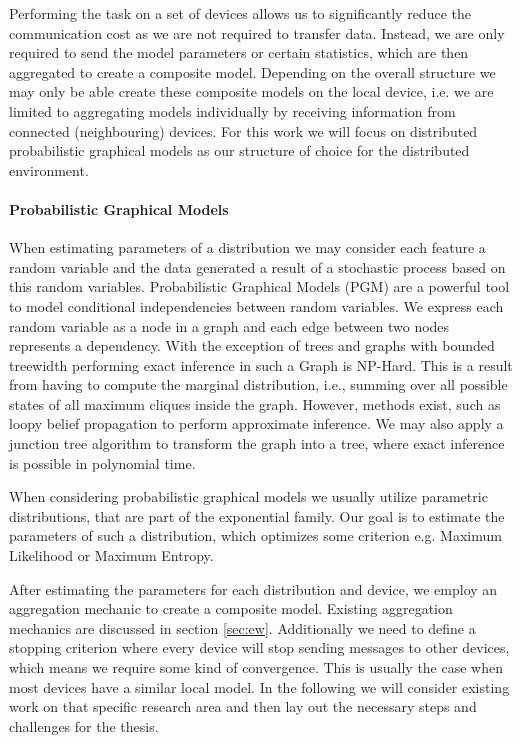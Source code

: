   Performing the task on a set of devices allows us to significantly reduce the communication cost as we are not required to transfer data.
  Instead, we are only required to send the model parameters or certain statistics, which are then aggregated to create a composite model.
  Depending on the overall structure we may only be able create these composite models on the local device, i.e. we are limited to aggregating models individually by receiving information from connected (neighbouring) devices.
  For this work we will focus on distributed probabilistic graphical models as our structure of choice for the distributed environment.
  \paragraph{Probabilistic Graphical Models}  


  When estimating parameters of a distribution we may consider each feature a random variable and the data generated a result of a stochastic process based on this random variables.
  Probabilistic Graphical Models (PGM) are a powerful tool to model conditional independencies between random variables. 
  We express each random variable as a node in a graph and each edge between two nodes represents a dependency. 
  With the exception of trees and graphs with bounded treewidth performing exact inference in such a Graph is NP-Hard.
  This is a result from having to compute the marginal distribution, i.e., summing over all possible states of all maximum cliques inside the graph.
  However, methods exist, such as loopy belief propagation to perform approximate inference.
  We may also apply a junction tree algorithm to transform the graph into a tree, where exact inference is possible in polynomial time.
    
  When considering probabilistic graphical models we usually utilize parametric distributions, that are part of the exponential family. 
  Our goal is to estimate the parameters of such a distribution, which optimizes some criterion e.g. Maximum Likelihood or Maximum Entropy.
  

  After estimating the parameters for each distribution and device, we employ an aggregation mechanic to create a composite model.
  Existing aggregation mechanics are discussed in section \ref{sec:ew}.
  Additionally we need to define a stopping criterion where every device will stop sending messages to other devices, which means we require some kind of convergence.
  This is usually the case when most devices have a similar local model.
  In the following we will consider existing work on that specific research area and then lay out the necessary steps and challenges for the thesis.

